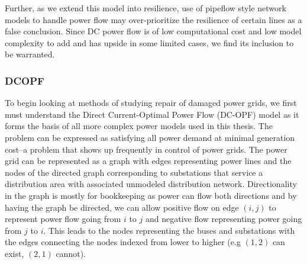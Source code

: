 \documentclass{article}
\begin{document}
	Further, as we extend this model into resilience, use of pipeflow style network models to handle power flow may over-prioritize the resilience of certain lines as a false conclusion. Since DC power flow is of low computational cost and low model complexity to add and has upside in some limited cases, we find its inclusion to be warranted.
	\subsubsection{DCOPF}
		To begin looking at methods of studying repair of damaged power grids, we first must understand the Direct Current-Optimal Power Flow (DC-OPF) model as it forms the basis of all more complex power models used in this thesis. The problem can be expressed as satisfying all power demand at minimal generation cost--a problem that shows up frequently in control of power grids. The power grid can be represented as a graph with edges representing power lines and the nodes of the directed graph corresponding to substations that service a distribution area with associated unmodeled distribution network. Directionality in the graph is mostly for bookkeeping as power can flow both directions and by having the graph be directed, we can allow positive flow on edge $(i,j)$ to represent power flow going from $i$ to $j$ and negative flow representing power going from $j$ to $i$. This leads to the nodes representing the buses and substations with the edges connecting the nodes indexed from lower to higher (e.g $(1,2)$ can exist, $(2,1)$ cannot).
		
\end{document}
